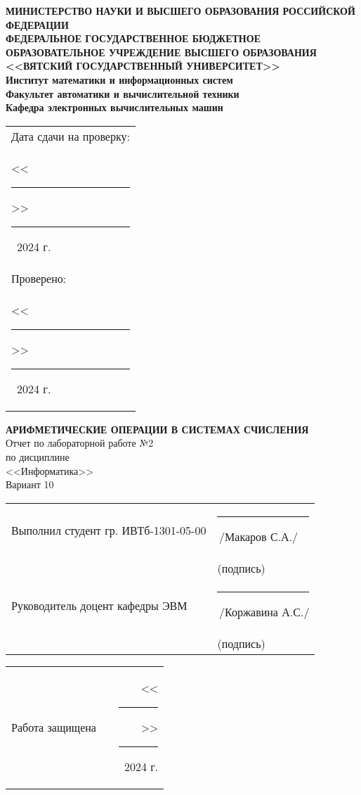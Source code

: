 \documentclass[a4paper,14pt]{extarticle}
\begin{document}
  \newpage\pagestyle{empty}
  \begin{center}
  \textbf{
    \MakeUppercase{
      Министерство науки и высшего образования Российской Федерации\\
      Федеральное государственное бюджетное образовательное учреждение высшего образования\\
      <<Вятский Государственный Университет>>\\
    }
    Институт математики и информационных систем\\
    Факультет автоматики и вычислительной техники\\
    Кафедра электронных вычислительных машин
  }
  \end{center}
  \vfill

  \hfill
  \begin{tabular}{l}
    \footnotesize Дата сдачи на проверку:\\
    \footnotesize <<\rule[-1mm]{5mm}{0.10mm}\/>>\rule[-1mm]{20mm}{0.10mm}\ 2024 г.\\
    \footnotesize Проверено:\\
    \footnotesize <<\rule[-1mm]{5mm}{0.10mm}\/>>\rule[-1mm]{20mm}{0.10mm}\ 2024 г.
  \end{tabular}
  \vfill

  \begin{center}
    \textbf{\MakeUppercase{Арифметические операции в системах счисления}}\\
    Отчет по лабораторной работе №2\\
    по дисциплине\\
    <<Информатика>>\\
    Вариант 10
  \end{center}
  \vfill

  \noindent
  \begin{tabular}{ll}
    Выполнил студент гр. ИВТб-1301-05-00 &
    \rule[-1mm]{30mm}{0.10mm}\,/Макаров С.А./\\
    & \hspace{8mm}\footnotesize(подпись)\\
    
    Руководитель доцент кафедры ЭВМ & \rule[-1mm]{30mm}{0.10mm}\,/Коржавина А.С./\\
    & \hspace{8mm}\footnotesize(подпись)\\
  \end{tabular}

  \noindent
  \begin{tabular}{lp{58mm}r}
    Работа защищена &  & <<\rule[-1mm]{5mm}{0.10mm}\/>>\rule[-1mm]{30mm}{0.10mm}\ 2024 г.
  \end{tabular}
  \vfill
\end{document}
